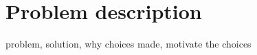 \section{Problem description}
{\color{red}problem, solution, why choices made, motivate the choices}
